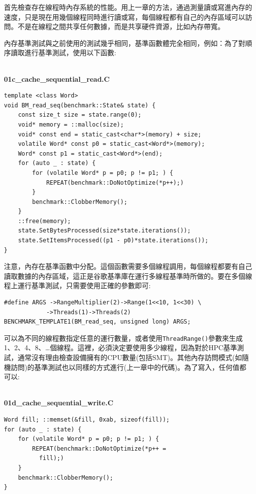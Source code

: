 首先檢查存在線程時內存系統的性能。用上一章的方法，通過測量讀或寫進內存的速度，只是現在用幾個線程同時進行讀或寫，每個線程都有自己的內存區域可以訪問。不是在線程之間共享任何數據，而是共享硬件資源，比如內存帶寬。

內存基準測試與之前使用的測試幾乎相同，基準函數體完全相同，例如：為了對順序讀取進行基準測試，使用以下函數:

\hspace*{\fill} \\ %
\noindent
\textbf{01c\_cache\_sequential\_read.C}
\begin{lstlisting}[style=styleCXX]
template <class Word>
void BM_read_seq(benchmark::State& state) {
	const size_t size = state.range(0);
	void* memory = ::malloc(size);
	void* const end = static_cast<char*>(memory) + size;
	volatile Word* const p0 = static_cast<Word*>(memory);
	Word* const p1 = static_cast<Word*>(end);
	for (auto _ : state) {
		for (volatile Word* p = p0; p != p1; ) {
			REPEAT(benchmark::DoNotOptimize(*p++);)
		}
		benchmark::ClobberMemory();
	}
	::free(memory);
	state.SetBytesProcessed(size*state.iterations());
	state.SetItemsProcessed((p1 - p0)*state.iterations());
}
\end{lstlisting}

注意，內存在基準函數中分配。這個函數需要多個線程調用，每個線程都要有自己讀取數據的內存區域，這正是谷歌基準庫在運行多線程基準時所做的。要在多個線程上運行基準測試，只需要使用正確的參數即可:

\begin{lstlisting}[style=styleCXX]
#define ARGS ->RangeMultiplier(2)->Range(1<<10, 1<<30) \
			->Threads(1)->Threads(2)
BENCHMARK_TEMPLATE1(BM_read_seq, unsigned long) ARGS;
\end{lstlisting}

可以為不同的線程數指定任意的運行數量，或者使用\texttt{ThreadRange()}參數來生成1、2、4、8、…個線程。這裡，必須決定要使用多少線程，因為對於HPC基準測試，通常沒有理由檢查設備擁有的CPU數量(包括SMT)。其他內存訪問模式(如隨機訪問)的基準測試也以同樣的方式進行(上一章中的代碼)。為了寫入，任何值都可以:

\hspace*{\fill} \\ %
\noindent
\textbf{01d\_cache\_sequential\_write.C}
\begin{lstlisting}[style=styleCXX]
Word fill; ::memset(&fill, 0xab, sizeof(fill));
for (auto _ : state) {
	for (volatile Word* p = p0; p != p1; ) {
		REPEAT(benchmark::DoNotOptimize(*p++ =
		  fill);)
	}
	benchmark::ClobberMemory();
}
\end{lstlisting}

